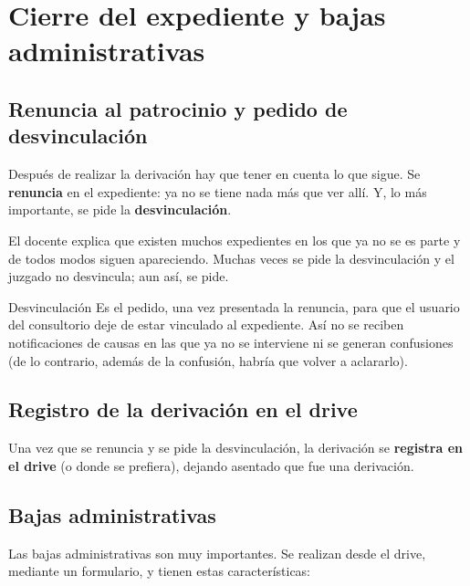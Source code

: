 \documentclass[12pt,oneside]{book}
\begin{document}
\chapter[Cierre del expediente y bajas]{Cierre del expediente y bajas administrativas}

\section{Renuncia al patrocinio y pedido de desvinculación}

Después de realizar la derivación hay que tener en cuenta lo que sigue. Se \textbf{renuncia} en el expediente: ya no se tiene nada más que ver allí. Y, lo más importante, se pide la \textbf{desvinculación}.

El docente explica que existen muchos expedientes en los que ya no se es parte y de todos modos siguen apareciendo. Muchas veces se pide la desvinculación y el juzgado no desvincula; aun así, se pide.

\begin{definition}{Desvinculación}
Es el pedido, una vez presentada la renuncia, para que el usuario del consultorio deje de estar vinculado al expediente. Así no se reciben notificaciones de causas en las que ya no se interviene ni se generan confusiones (de lo contrario, además de la confusión, habría que volver a aclararlo).
\end{definition}

\section{Registro de la derivación en el drive}

Una vez que se renuncia y se pide la desvinculación, la derivación se \textbf{registra en el drive} (o donde se prefiera), dejando asentado que fue una derivación.

\section{Bajas administrativas}

Las bajas administrativas son muy importantes. Se realizan desde el drive, mediante un formulario, y tienen estas características:
\end{document}
